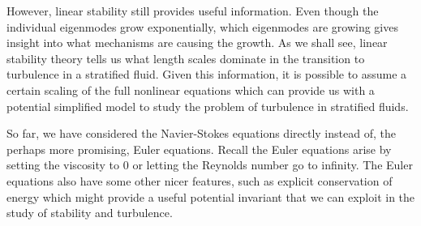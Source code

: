 However, linear stability still provides useful information. Even though the individual eigenmodes grow exponentially, which eigenmodes are growing gives insight into what mechanisms are causing the growth. As we shall see, linear stability theory tells us what length scales dominate in the transition to turbulence in a stratified fluid. Given this information, it is possible to assume a certain scaling of the full nonlinear equations which can provide us with a potential simplified model to study the problem of turbulence in stratified fluids. 

So far, we have considered the Navier-Stokes equations directly instead of, the perhaps more promising, Euler equations. Recall the Euler equations arise by setting the viscosity to $0$ or letting the Reynolds number go to infinity. The Euler equations also have some other nicer features, such as explicit conservation of energy which might provide a useful potential invariant that we can exploit in the study of stability and turbulence. 

